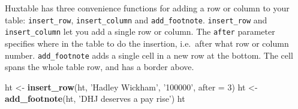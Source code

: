 \documentclass[]{article}
\newenvironment{Shaded}{\begin{snugshade}}{\end{snugshade}}
\newcommand{\KeywordTok}[1]{\textcolor[rgb]{0.13,0.29,0.53}{\textbf{#1}}}
\newcommand{\DataTypeTok}[1]{\textcolor[rgb]{0.13,0.29,0.53}{#1}}
\newcommand{\DecValTok}[1]{\textcolor[rgb]{0.00,0.00,0.81}{#1}}
\newcommand{\StringTok}[1]{\textcolor[rgb]{0.31,0.60,0.02}{#1}}
\newcommand{\NormalTok}[1]{#1}
\begin{document}
Huxtable has three convenience functions for adding a row or column to
your table: \texttt{insert\_row}, \texttt{insert\_column} and
\texttt{add\_footnote}. \texttt{insert\_row} and \texttt{insert\_column}
let you add a single row or column. The \texttt{after} parameter
specifies where in the table to do the insertion, i.e.~after what row or
column number. \texttt{add\_footnote} adds a single cell in a new row at
the bottom. The cell spans the whole table row, and has a border above.

\begin{Shaded}
\begin{Highlighting}[]
\NormalTok{ht <-}\StringTok{ }\KeywordTok{insert_row}\NormalTok{(ht, }\StringTok{'Hadley Wickham'}\NormalTok{, }\StringTok{'100000'}\NormalTok{, }\DataTypeTok{after =} \DecValTok{3}\NormalTok{)}
\NormalTok{ht <-}\StringTok{ }\KeywordTok{add_footnote}\NormalTok{(ht, }\StringTok{'DHJ deserves a pay rise'}\NormalTok{)}
\NormalTok{ht}
\end{Highlighting}
\end{Shaded}
\end{document}

